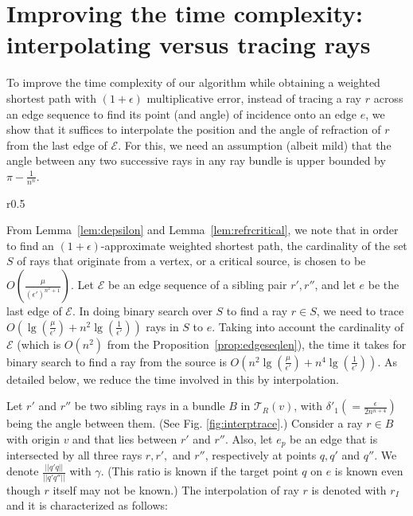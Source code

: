 \documentclass[11pt]{article}
\def\calT{\mathcal{T}}
\def\calE{\mathcal{E}}
\begin{document}
\section{Improving the time complexity: interpolating versus tracing rays}
\label{sect:interpol}

To improve the time complexity of our algorithm while obtaining a weighted shortest path with $(1+\epsilon)$ multiplicative error, instead of tracing a ray $r$ across an edge sequence to find its point (and angle) of incidence onto an edge $e$, we show that it suffices to interpolate the position and the angle of refraction of $r$ from the last edge of $\calE$.
For this, we need an assumption (albeit mild) that the angle between any two successive rays in any ray bundle is upper bounded by $\pi - \frac{1}{n^n}$.

\begin{wrapfigure}{r}{0.5\textwidth}
\centering
\begin{minipage}[b]{.4\textwidth}
\caption{\footnotesize Illustrating the error in interpolating versus tracing a ray across an edge sequence $\calE$}
\label{fig:interptrace}
\end{minipage}
\end{wrapfigure}

From Lemma~\ref{lem:depsilon} and Lemma~\ref{lem:refrcritical}, we note that in order to find an $(1+\epsilon)$-approximate weighted shortest path, the cardinality of the set $S$ of rays that originate from a vertex, or a critical source, is chosen to be $O(\frac{\mu}{(\epsilon')^{n^2+1}})$.
Let $\calE$ be an edge sequence of a sibling pair $r', r''$, and let $e$ be the last edge of $\calE$.
In doing binary search over $S$ to find a ray $r \in S$, we need to trace $O(\lg(\frac{\mu}{\epsilon'}) + n^2\lg({\frac{1}{\epsilon'}}))$ rays in $S$ to $e$.
Taking into account the cardinality of $\calE$ (which is $O(n^2)$ from the Proposition~\ref{prop:edgeseqlen}), the time it takes for binary search to find a ray from the source is $O(n^2 \lg(\frac{\mu}{\epsilon'}) + n^4\lg({\frac{1}{\epsilon'}}))$.
As detailed below, we reduce the time involved in this by interpolation. 

Let $r'$ and $r''$ be two sibling rays in a bundle $B$ in ${\calT}_R(v)$, with $\delta'_1 (= \frac{\epsilon}{2n^{n+4}})$ being the angle between them.
(See Fig. \ref{fig:interptrace}.)
Consider a ray $r \in B$ with origin $v$ and that lies between $r'$ and $r''$.
Also, let $e_p$ be an edge that is intersected by all three rays $r, r',$ and $r''$, respectively at points $q, q'$ and $q''$.
We denote $\frac{||q'q||}{||q'q''||}$ with $\gamma$.
(This ratio is known if the target point $q$ on $e$ is known even though $r$ itself may not be known.)
The interpolation of ray $r$ is denoted with $r_I$ and it is characterized as follows:
\end{document}

